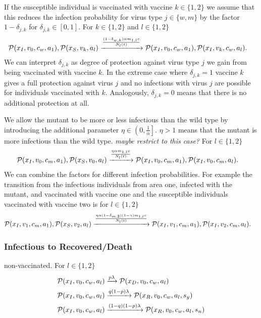 If the susceptible individual is vaccinated with vaccine $k \in \{1,2\}$ we assume that this reduces the infection probability for virus type $j \in \{w,m\}$ by the factor $1 - \delta_{j,k}$ for $\delta_{j,k} \in [0,1]$. For $k \in \{1,2 \}$ and $l \in \{1,2\}$
\begin{align*}
\mathcal{P}(x_{I},  v_0, c_w, a_1), \mathcal{P}(x_{S}, v_k, a_l) &\xrightarrow{\frac{(1-\delta_{w,k}) \alpha  m_{1,l} c}{N_l(t)}} \mathcal{P}(x_{I},  v_0, c_w, a_1), \mathcal{P}(x_{I},  v_k, c_w, a_l).
\end{align*}
We can interpret $\delta_{j,k}$ as degree of protection against virus type $j$ we gain from being vaccinated with vaccine $k$. In the extreme case where $\delta_{j,k} = 1$ vaccine $k$ gives a full protection against virus $j$ and no infections with virus $j$ are possible for individuals vaccinated with $k$. Analogously, $\delta_{j,k} = 0$ means that there is no additional protection at all.

We allow the mutant to be more or less infectious than the wild type by introducing the additional parameter $\eta \in \left(0, \frac{1}{\alpha}\right]$. $\eta > 1$ means that the mutant is more infectious than the wild type. \textit{maybe restrict to this case?} 
For $l \in \{1,2\}$
\begin{align*}
\mathcal{P}(x_{I},  v_0, c_m, a_1), \mathcal{P}(x_{S}, v_0, a_l) &\xrightarrow{\frac{ \eta \alpha  m_{1,l} c}{N_l(t)}} \mathcal{P}(x_{I},  v_0, c_m, a_1), \mathcal{P}(x_{I},  v_0, c_m, a_l).
\end{align*}
We can combine the factors for different infection probabilities. For example the transition from the infectious individuals from area one, infected with the mutant, and vaccinated with vaccine one and the susceptible individuals vaccinated with vaccine two is for $l \in \{1,2\}$
\begin{align*}
\mathcal{P}(x_{I},  v_1, c_m, a_1), \mathcal{P}(x_{S}, v_2, a_l) &\xrightarrow{\frac{ \eta \alpha (1-\delta_{m,2}) (1-\gamma)  m_{1,l} c}{N_l(t)}} \mathcal{P}(x_{I},  v_1, c_m, a_1), \mathcal{P}(x_{I},  v_2, c_m, a_l).
\end{align*}

\subsubsection*{Infectious to Recovered/Death}
non-vaccinated. For $l \in \{1,2\}$
\begin{align}
    \mathcal{P}(x_I,  v_0, c_w, a_l) &\xrightarrow{p \lambda} \mathcal{P}(x_D,  v_0, c_w, a_l) \notag \\
\mathcal{P}(x_I,  v_0, c_w, a_l) &\xrightarrow{q(1-p) \lambda} \mathcal{P}(x_R,  v_0, c_w, a_l, s_y) \notag \\
\mathcal{P}(x_I,  v_0, c_w, a_l) &\xrightarrow{(1-q)(1-p) \lambda} \mathcal{P}(x_R,  v_0, c_w, a_l, s_n) \notag
\end{align}

